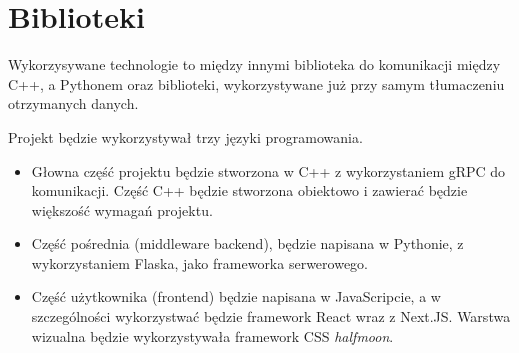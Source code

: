 \documentclass{article}
\begin{document}
\section{Biblioteki}

Wykorzysywane technologie to między innymi biblioteka do komunikacji między C++, a Pythonem oraz biblioteki, wykorzystywane już przy samym tłumaczeniu otrzymanych danych.

Projekt będzie wykorzystywał trzy języki programowania. 

\begin{itemize}
  \item Głowna część projektu będzie stworzona w C++ z wykorzystaniem gRPC do komunikacji. Część C++ będzie stworzona obiektowo i zawierać będzie większość wymagań projektu. 
  \item Część pośrednia (middleware backend), będzie napisana w Pythonie, z wykorzystaniem Flaska, jako frameworka serwerowego. 
  \item Część użytkownika (frontend) będzie napisana w JavaScripcie, a w szczególności wykorzystwać będzie framework React wraz z Next.JS. Warstwa wizualna będzie wykorzystywała framework CSS \textit{halfmoon}. 
\end{itemize}
\end{document}
